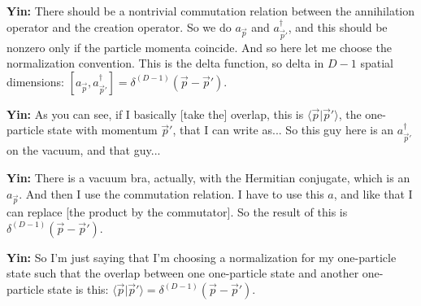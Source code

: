 \noindent\textbf{Yin:} There should be a nontrivial commutation relation between the annihilation operator and the creation operator. So we do $a_{\vec p}$ and $a^\dagger_{\vec p'}$, and this should be nonzero only if the particle momenta coincide. And so here let me choose the normalization convention. This is the delta function, so delta in $D-1$ spatial dimensions: $[a_{\vec p},a^\dagger_{\vec p'}]=\delta^{(D-1)}(\vec p-\vec p')$.\par

\noindent\textbf{Yin:} As you can see, if I basically [take the] overlap, this is $\langle\vec p|\vec p'\rangle$, the one-particle state with momentum $\vec p'$, that I can write as... So this guy here is an $a^\dagger_{\vec p'}$ on the vacuum, and that guy...\par

\noindent\textbf{Yin:} There is a vacuum bra, actually, with the Hermitian conjugate, which is an $a_{\vec p}$. And then I use the commutation relation. I have to use this $a$, and like that I can replace [the product by the commutator]. So the result of this is $\delta^{(D-1)}(\vec p-\vec p')$.\par

\noindent\textbf{Yin:} So I'm just saying that I'm choosing a normalization for my one-particle state such that the overlap between one one-particle state and another one-particle state is this: $\langle\vec p|\vec p'\rangle=\delta^{(D-1)}(\vec p-\vec p')$.\par

